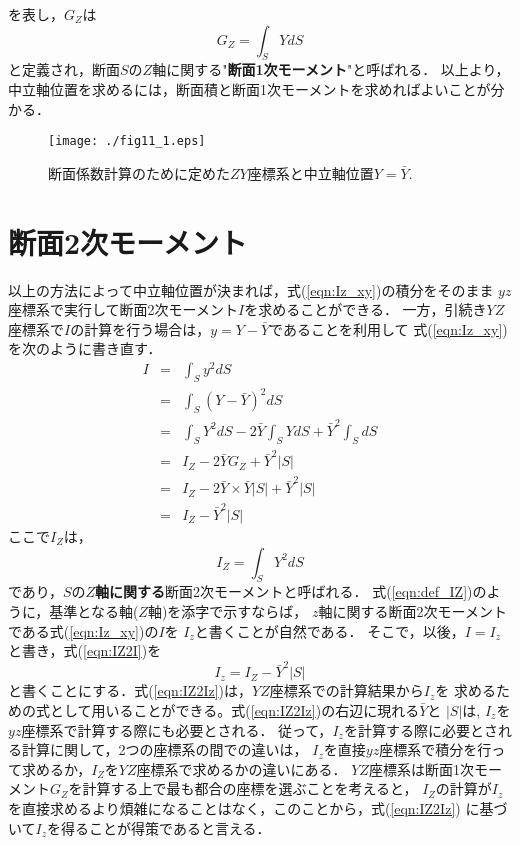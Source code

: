 \documentclass[10pt,a4j]{jbook}
\begin{document}
を表し，$G_Z$は
\begin{equation}
	G_Z=\int_S YdS 
	\label{eqn:GZ}
\end{equation}
と定義され，断面$S$の$Z$軸に関する"{\bf 断面1次モーメント}"と呼ばれる．
以上より，中立軸位置を求めるには，断面積と断面1次モーメントを求めればよいことが分かる．
\begin{figure}[h]
	\begin{center}
	\texttt{[image: ./fig11\_1.eps]} 
	\end{center}
	\caption{
		断面係数計算のために定めた$ZY$座標系と中立軸位置$Y=\bar Y$.
	} 
	\label{fig:fig11_1}
\end{figure}
\section{断面2次モーメント}
以上の方法によって中立軸位置が決まれば，式(\ref{eqn:Iz_xy})の積分をそのまま
$yz$座標系で実行して断面2次モーメント$I$を求めることができる．
一方，引続き$YZ$座標系で$I$の計算を行う場合は，$y=Y-\bar{Y}$であることを利用して
式(\ref{eqn:Iz_xy})を次のように書き直す．
\begin{eqnarray}
	I &= &
	\int_S y^2 dS 
	\nonumber \\
	 &= &
	\int_S \left( Y-\bar{Y}\right)^2 dS 
	\nonumber \\
	 &= &
	\int_S Y^2dS -2\bar{Y}\int_S Y dS +\bar Y^2 \int_S dS
	\nonumber \\
	 &= &
	 I_Z-2\bar{Y}G_Z+\bar{Y}^2\left| S \right|
	\nonumber \\
	 &= &
	 I_Z-2\bar{Y}\times \bar{Y}\left| S \right|+\bar{Y}^2 \left| S \right|
	\nonumber \\
	 &= &
	 I_Z-\bar{Y}^2\left| S \right|
	\label{eqn:IZ2I}
\end{eqnarray}
ここで$I_Z$は，
\begin{equation}
	I_Z=\int_S Y^2 dS
	\label{eqn:def_IZ}
\end{equation}
であり，$S$の{\bf $Z$軸に関する}断面2次モーメントと呼ばれる．
式(\ref{eqn:def_IZ})のように，基準となる軸($Z$軸)を添字で示すならば，
$z$軸に関する断面2次モーメントである式(\ref{eqn:Iz_xy})の$I$を
$I_z$と書くことが自然である．
そこで，以後，$I=I_z$と書き，式(\ref{eqn:IZ2I})を
\begin{equation}
	I_z=I_Z-\bar Y^2 \left| S \right|
	\label{eqn:IZ2Iz}
\end{equation}
と書くことにする．式(\ref{eqn:IZ2Iz})は，$YZ$座標系での計算結果から$I_z$を
求めるための式として用いることができる。式(\ref{eqn:IZ2Iz})の右辺に現れる$\bar{Y}$と
$\left| S\right|$は, $I_z$を$yz$座標系で計算する際にも必要とされる．
従って，$I_z$を計算する際に必要とされる計算に関して，2つの座標系の間での違いは，
$I_z$を直接$yz$座標系で積分を行って求めるか，$I_Z$を$YZ$座標系で求めるかの違いにある．
$YZ$座標系は断面1次モーメント$G_Z$を計算する上で最も都合の座標を選ぶことを考えると，
$I_Z$の計算が$I_z$を直接求めるより煩雑になることはなく，このことから，式(\ref{eqn:IZ2Iz})
に基づいて$I_z$を得ることが得策であると言える．
\end{document}
